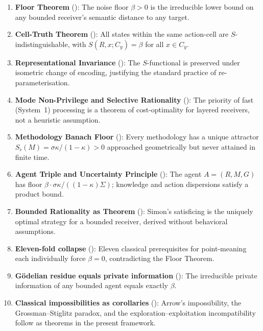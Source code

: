 \documentclass[twocolumn,11pt,a4paper]{article}
\newcommand{\Sfloor}{S_{\flat}}
\begin{document}
\begin{enumerate}[label=(\roman*),leftmargin=*]
  \item \textbf{Floor Theorem} (): The noise floor $\beta>0$
    is the irreducible lower bound on any bounded receiver's semantic
    distance to any target.

  \item \textbf{Cell-Truth Theorem} (): All states
    within the same action-cell are $S$-indistinguishable, with
    $S(R,x;C_y)=\beta$ for all $x\in C_y$.

  \item \textbf{Representational Invariance} ():
    The $S$-functional is preserved under isometric change of encoding,
    justifying the standard practice of re-parameterisation.

  \item \textbf{Mode Non-Privilege and Selective Rationality}
    (): The priority
    of fast (System~1) processing is a theorem of cost-optimality for
    layered receivers, not a heuristic assumption.

  \item \textbf{Methodology Banach Floor} (): Every
    methodology has a unique attractor $\Sfloor(M)=\sigma\kappa/(1-\kappa)
    >0$ approached geometrically but never attained in finite time.

  \item \textbf{Agent Triple and Uncertainty Principle}
    (): The agent $A=(R,M,G)$
    has floor $\beta\cdot\sigma\kappa/((1-\kappa)\Sigma)$; knowledge and
    action dispersions satisfy a product bound.

  \item \textbf{Bounded Rationality as Theorem}
    (): Simon's satisficing is the
    uniquely optimal strategy for a bounded receiver, derived without
    behavioral assumptions.

  \item \textbf{Eleven-fold collapse} (): Eleven
    classical prerequisites for point-meaning each individually force
    $\beta=0$, contradicting the Floor Theorem.

  \item \textbf{G\"odelian residue equals private information}
    (): The irreducible
    private information of any bounded agent equals exactly $\beta$.

  \item \textbf{Classical impossibilities as corollaries}
    (): Arrow's impossibility, the
    Grossman--Stiglitz paradox, and the exploration--exploitation
    incompatibility follow as theorems in the present framework.
\end{enumerate}
\end{document}
